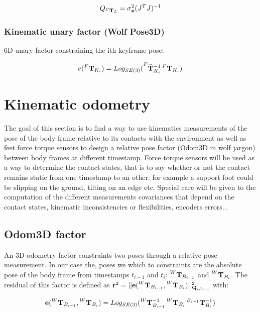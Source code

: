 \documentclass[11pt]{article}
\newcommand{\T}[2]{\prescript{#1}{}{\bfT}_{#2}}
\newcommand{\Tm}[2]{\prescript{#1}{}{\widetilde{\bfT}}_{#2}}
\begin{document}
\begin{equation}
Q_{\T{C}{L}} = \sigma_{\bfx}^2(J^T J)^{-1}    
\end{equation}





\subsubsection*{Kinematic unary factor (Wolf Pose3D)}
6D unary factor constraining the ith keyframe pose:

\begin{equation*}
e(\T{F}{K_i}) = Log_{SE(3)}(\Tm{F}{K_i}^{-1} \T{F}{K_i})    
\end{equation*}



\section{Kinematic odometry}
The goal of this section is to find a way to use kinematics measurements of the pose of the body frame relative to its contacts with the environment as well as feet force torque sensors to design a relative pose factor (Odom3D in wolf jargon) between body frames at different timestamp. Force torque sensors will be used as a way to determine the contact states, that is to say whether or not the contact remains static from one timestamp to an other: for example a support foot could be slipping on the ground, tilting on an edge etc.
Special care will be given to the computation of the different measurements covariances that depend on the contact states, kinematic inconsistencies or flexibilities, encoders errors...

\subsection{Odom3D factor}
An 3D odometry factor constraints two poses through a relative pose measurement. In our case the, poses we which to constraints are the absolute pose of the body frame from timestamps $t_{i-1}$ and $t_{i}$: $\T{W}{B_{i-1}}$ and $\T{W}{B_i}$. The residual of this factor is defined as $\bfr^2 = ||\bfe(\T{W}{B_{i-1}}, \T{W}{B_i})||^2_{\bfQ_{i/i-1}}$
 with:
 
 \begin{equation*}
 \bfe(\T{W}{B_{i-1}}, \T{W}{B_i}) =  Log_{SE(3)}(
 \T{W}{B_{i-1}}^{-1}
 \T{W}{B_i}
 \T{B_{i-1}}{B_i}^{-1}
 )     
 \end{equation*} 
\end{document}
